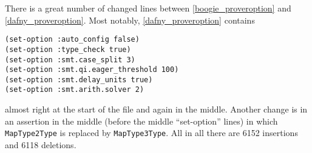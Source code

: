 \documentclass{scrartcl}
\begin{document}
There is a great number of changed lines between
\ref{boogie_proveroption} and \ref{dafny_proveroption}.
Most notably, \ref{dafny_proveroption} contains
\begin{lstlisting}[frame=single]
(set-option :auto_config false)
(set-option :type_check true)
(set-option :smt.case_split 3)
(set-option :smt.qi.eager_threshold 100)
(set-option :smt.delay_units true)
(set-option :smt.arith.solver 2)
\end{lstlisting}
almost right at the start of the file and again in the middle.
Another change is in an assertion in the middle (before the middle \enquote{set-option} lines)
in which \lstinline|MapType2Type| is replaced by \lstinline|MapType3Type|.
All in all there are 6152 insertions and 6118 deletions.
\end{document}
